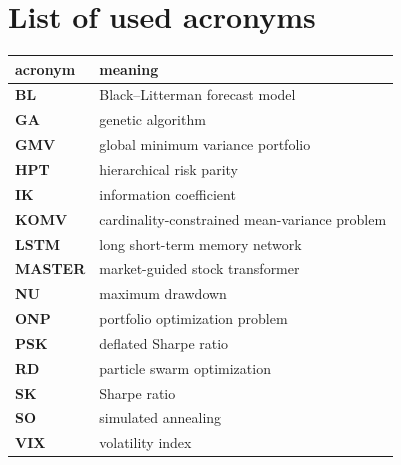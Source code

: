 \chapter*{List of used acronyms}

\begin{tabular}{l|l}
  {\bf acronym} & {\bf meaning} \\ \hline
  {\bf BL}    & Black--Litterman forecast model \\
  {\bf GA}    & genetic algorithm \\
  {\bf GMV}   & global minimum variance portfolio \\
  {\bf HPT}   & hierarchical risk parity \\
  {\bf IK}    & information coefficient \\
  {\bf KOMV}  & cardinality-constrained mean-variance problem \\
  {\bf LSTM}  & long short-term memory network \\
  {\bf MASTER}& market-guided stock transformer \\
  {\bf NU}    & maximum drawdown \\
  {\bf ONP}   & portfolio optimization problem \\
  {\bf PSK}   & deflated Sharpe ratio \\
  {\bf RD}    & particle swarm optimization \\
  {\bf SK}    & Sharpe ratio \\
  {\bf SO}    & simulated annealing \\
  {\bf VIX}   & volatility index \\
\end{tabular}

